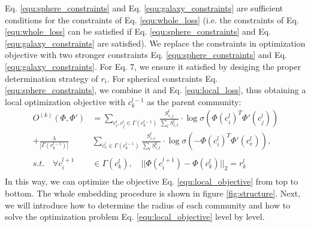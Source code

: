 \documentclass{article}
\theoremstyle{definition}
\begin{document}
	 Eq. \ref{equ:sphere_constraints} and Eq. \ref{equ:galaxy_constraints} are sufficient conditions for the constraints of Eq. \ref{equ:whole_loss} (i.e. the constraints of Eq. \ref{equ:whole_loss} can be satisfied if Eq. \ref{equ:sphere_constraints} and Eq. \ref{equ:galaxy_constraints} are satisfied). 
	 We replace the constraints in optimization objective with two stronger constraints Eq. \ref{equ:sphere_constraints} and Eq. \ref{equ:galaxy_constraints}. 
	 For Eq. 7, we ensure it satisfied by desiging the proper determination strategy of $r_i$. For spherical constraints Eq. \ref{equ:sphere_constraints}, we combine it and Eq. \ref{equ:local_loss}, thus obtaining a local optimization objective with $c_k^{l-1}$ as the parent community: 
	  \begin{equation}
	  \label{equ:local_objective}
	  \begin{split}
	  O^{(k)}(\Phi, \Phi') & = \sum_{c_i^l, c_j^l \in \Gamma(c_k^{l-1})} \frac{S_{i,j}^l}{\sum_t S_{i, t}^l} \cdot \log{\sigma(\Phi(c_i^l)^T \Phi'(c_j^l))} \\
		 + \frac{\lambda}{|\Gamma(c_k^{l-1})|}&\sum_{c_e^l \in \Gamma(c_k^{l-1})} \frac{S_{i, e}^l}{\sum_t S_{i, t}^l} \cdot \log{\sigma(-\Phi(c_i^l)^T \Phi'(c_e^l))}, \\
		 \\
		s.t. \quad \forall c_i^{l+1} & \in \Gamma(c_k^l),\quad || \Phi(c_i^{l+1})  - \Phi(c_k^l)||_2= r_k^l \\
	  \end{split}
	  \end{equation}
	 In this way, we can optimize the objective Eq. \ref{equ:local_objective} from top to bottom. The whole embedding procedure is shown in figure \ref{fig:structure}. Next, we will introduce how to determine the radius of each community and how to solve the optimization problem Eq. \ref{equ:local_objective} level by level.
\end{document}
